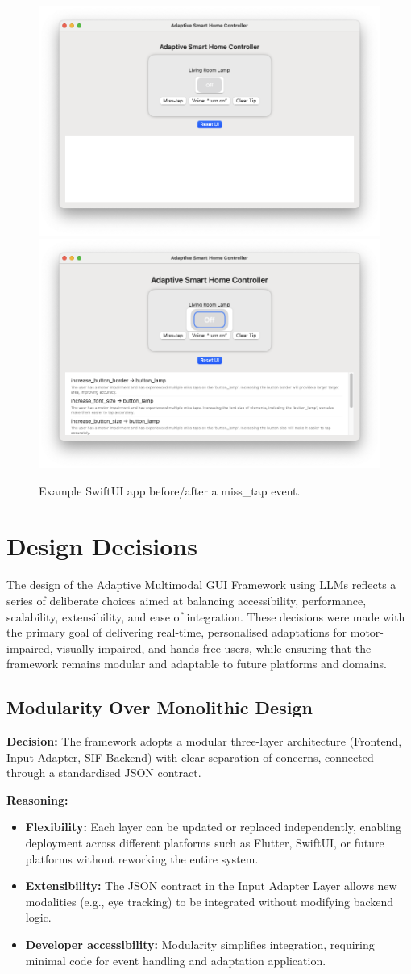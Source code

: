 \begin{figure}[h]
\centering
\includegraphics[width=.5\linewidth]{images/fig_swift_before.png}\hfill
\includegraphics[width=.5\linewidth]{images/fig_swift_after.png}
\caption{Example SwiftUI app before/after a miss\_tap event.}
\label{fig:swift-adapt}
\end{figure}

\section{Design Decisions}
The design of the Adaptive Multimodal GUI Framework using LLMs reflects a series of deliberate choices aimed at balancing accessibility, performance, scalability, extensibility, and ease of integration. These decisions were made with the primary goal of delivering real-time, personalised adaptations for motor-impaired, visually impaired, and hands-free users, while ensuring that the framework remains modular and adaptable to future platforms and domains.

\subsection{Modularity Over Monolithic Design}
\textbf{Decision:} The framework adopts a modular three-layer architecture (Frontend, Input Adapter, SIF Backend) with clear separation of concerns, connected through a standardised JSON contract.

\textbf{Reasoning:}
\begin{itemize}
    \item \textbf{Flexibility:} Each layer can be updated or replaced independently, enabling deployment across different platforms such as Flutter, SwiftUI, or future platforms without reworking the entire system.
    \item \textbf{Extensibility:} The JSON contract in the Input Adapter Layer allows new modalities (e.g., eye tracking) to be integrated without modifying backend logic.
    \item \textbf{Developer accessibility:} Modularity simplifies integration, requiring minimal code for event handling and adaptation application.
\end{itemize}

